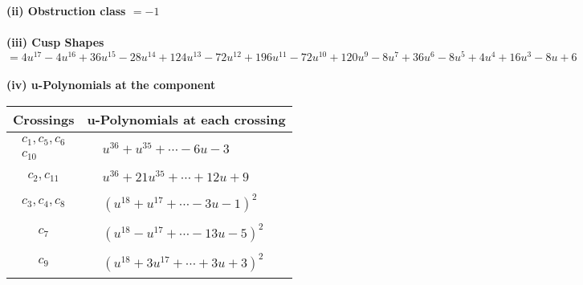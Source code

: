 \documentclass[1p]{elsarticle_modified}
\theoremstyle{definition}
\begin{document}
\flushleft \textbf{(ii) Obstruction class $= -1$}\\~\\
\flushleft \textbf{(iii) Cusp Shapes $= 4 u^{17}-4 u^{16}+36 u^{15}-28 u^{14}+124 u^{13}-72 u^{12}+196 u^{11}-72 u^{10}+120 u^9-8 u^7+36 u^6-8 u^5+4 u^4+16 u^3-8 u+6$}\\~\\
\newpage\renewcommand{\arraystretch}{1}
\flushleft \textbf{(iv) u-Polynomials at the component}\newline \\
\begin{tabular}{m{50pt}|m{274pt}}
Crossings & \hspace{64pt}u-Polynomials at each crossing \\
\hline $$\begin{aligned}c_{1},c_{5},c_{6}\\c_{10}\end{aligned}$$&$\begin{aligned}
&u^{36}+u^{35}+\cdots-6 u-3
\end{aligned}$\\
\hline $$\begin{aligned}c_{2},c_{11}\end{aligned}$$&$\begin{aligned}
&u^{36}+21 u^{35}+\cdots+12 u+9
\end{aligned}$\\
\hline $$\begin{aligned}c_{3},c_{4},c_{8}\end{aligned}$$&$\begin{aligned}
&(u^{18}+u^{17}+\cdots-3 u-1)^{2}
\end{aligned}$\\
\hline $$\begin{aligned}c_{7}\end{aligned}$$&$\begin{aligned}
&(u^{18}- u^{17}+\cdots-13 u-5)^{2}
\end{aligned}$\\
\hline $$\begin{aligned}c_{9}\end{aligned}$$&$\begin{aligned}
&(u^{18}+3 u^{17}+\cdots+3 u+3)^{2}
\end{aligned}$\\
\hline
\end{tabular}\\~\\
\newpage\renewcommand{\arraystretch}{1}
\end{document}
